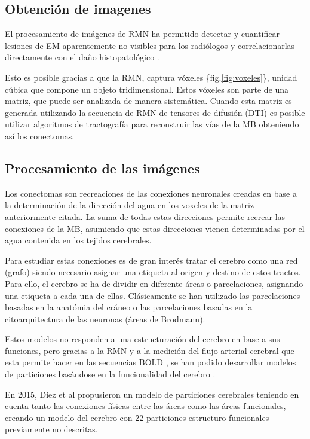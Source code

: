 \documentclass[fleqn,10pt]{UICArticle} %
\begin{document}
\subsection{Obtención de imagenes}

El procesamiento de imágenes de RMN ha permitido detectar y cuantificar lesiones de EM aparentemente no visibles para los radiólogos y correlacionarlas directamente con el daño histopatológico \cite{Beer2016}.

Esto es posible gracias a que la RMN, captura vóxeles \{fig.\ref{fig:voxeles}\}, unidad cúbica que compone un objeto tridimensional. Estos vóxeles son parte de una matriz, que puede ser analizada de manera sistemática. Cuando esta matriz es generada utilizando la secuencia de RMN de tensores de difusión (DTI) es posible utilizar algoritmos de tractografía para reconstruir las vías de la MB obteniendo así los conectomas.


\subsection{Procesamiento de las imágenes}
Los conectomas son recreaciones de las conexiones neuronales creadas en base a la determinación de la dirección del agua en los voxeles de la matriz anteriormente citada. La suma de todas estas direcciones permite recrear las conexiones de la MB, asumiendo que estas direcciones vienen determinadas por el agua contenida en los tejidos cerebrales.

Para estudiar estas conexiones es de gran interés tratar el cerebro como una red (grafo) siendo necesario asignar una etiqueta al origen y destino de estos tractos. Para ello, el cerebro se ha de dividir en diferente áreas o parcelaciones, asignando una etiqueta a cada una de ellas. Clásicamente se han utilizado las parcelaciones basadas en la anatómia del cráneo o las parcelaciones basadas en la citoarquitectura de las neuronas (áreas de Brodmann).

Estos modelos no responden a una estructuración del cerebro en base a sus funciones, pero gracias a la RMN y a la medición del flujo arterial cerebral que esta permite hacer en las secuencias BOLD \cite{Ogawa1990}, se han podido desarrollar modelos de particiones basándose en la funcionalidad del cerebro \cite{Heller2006}.

En 2015, Diez et al \cite{Diez2015} propusieron un modelo de particiones cerebrales teniendo en cuenta tanto las conexiones físicas entre las áreas como las áreas funcionales, creando un modelo del cerebro con 22 particiones estructuro-funcionales previamente no descritas. %
\end{document}
